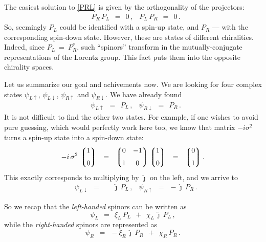\documentclass[epsfig,12pt]{article}
\newcommand{\lgr}{\left\lgroup}
\newcommand{\rgr}{\right\rgroup}
\newcommand{\jj}{\hat\jmath}
\begin{document}
	The easiest solution to \eqref{PRL} is given by the orthogonality of the projectors:
\begin{align}
	&
	P_R\, P_L	~~=~~	0\,,
	&
	P_L\, P_R	~~=~~	0\,.
\end{align}
	So, seemingly $ P_L $ could be identified with a spin-up state, and $ P_R $ --- with the corresponding
	spin-down state.
	However, these are states of different chiralities.
	Indeed, since $ P_L ~=~ P_R^* $, such ``spinors'' transform in the mutually-conjugate
	representations of the Lorentz group.
	This fact puts them into the opposite chirality spaces.

	Let us summarize our goal and achivements now.
	We are looking for four complex states $ \psi_{L\uparrow} $, $ \psi_{L\downarrow} $, $ \psi_{R\uparrow} $
	and $ \psi_{R\downarrow} $.
	We have already found
\begin{align}
	&
	\psi_{L\uparrow}		~~=~~	P_L\,,
	&
	\psi_{R\downarrow}	~~=~~	P_R\,.
\end{align}
	It is not difficult to find the other two states.
	For example, if one wishes to avoid pure guessing, which would perfectly work here too,
	we know that matrix $ -i \sigma^2 $ turns a spin-up state into a spin-down state:
\[
	-i\,\sigma^2\,
		\lgr
		\begin{matrix}
			1 \\[2mm]
			0
		\end{matrix}
		\rgr
	~~=~~
		\lgr
		\begin{matrix}
			0	&	-1 \\[2mm]
			1	&	0
		\end{matrix}
		\rgr
		\lgr
		\begin{matrix}
			1 \\[2mm]
			0
		\end{matrix}
		\rgr
	~~=~~
		\lgr
		\begin{matrix}
			0 \\[2mm]
			1
		\end{matrix}
		\rgr.	
\]
	This exactly corresponds to multiplying by $ \jj $ on the left, and we arrive to
\begin{align}
	&
	\psi_{L\downarrow}	~~=~~	\phantom{-}\jj\,P_L\,,
	&
	\psi_{R\uparrow}		~~=~~	-\jj\,P_R\,.
\end{align}

	So we recap that the \emph{left-handed} spinors can be written as
\begin{equation}
\label{lbasis-again}
	\psi_L	~~=~~	\xi_L\,P_L  ~~+~~  \chi_L\,\jj\,P_L\,,
\end{equation}
	while the \emph{right-handed} spinors are represented as
\begin{equation}
\label{rbasis-again}
	\psi_R	~~=~~	-\xi_R\,\jj\,P_R  ~~+~~  \chi_R\,P_R\,.
\end{equation}
\end{document}
